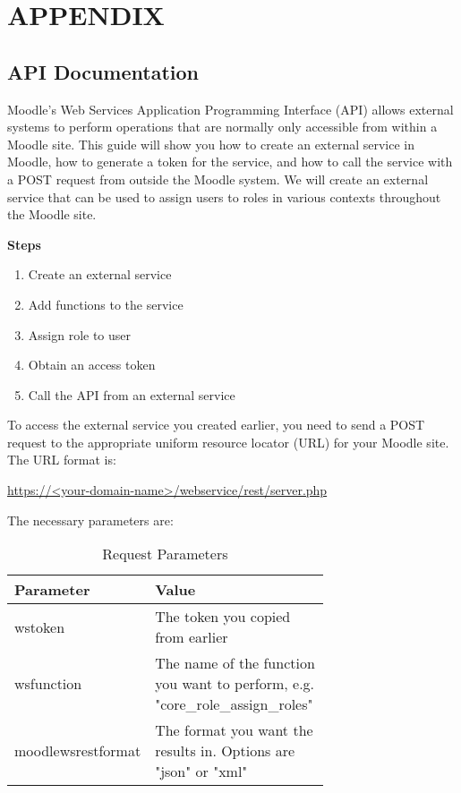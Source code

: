 \clearpage
\chapter*{APPENDIX}

\section{API Documentation}

Moodle's Web Services Application Programming Interface (API) allows external systems to perform operations that are normally only accessible from within a Moodle site. This guide will show you how to create an external service in Moodle, how to generate a token for the service, and how to call the service with a POST request from outside the Moodle system. We will create an external service that can be used to assign users to roles in various contexts throughout the Moodle site.

\textbf{Steps}
\begin{enumerate}
    \item Create an external service
    \item Add functions to the service
    \item Assign role to user
    \item Obtain an access token
    \item Call the API from an external service
\end{enumerate}


To access the external service you created earlier, you need to send a POST request to the appropriate uniform resource locator (URL) for your Moodle site. The URL format is:

\href{https://<your-domain-name>/webservice/rest/server.php}{https://<your-domain-name>/webservice/rest/server.php}

The necessary parameters are:
\begin{table}[H]
    \centering
    \begin{tabular}{|l|p{0.7\linewidth}|}
        \hline
        \textbf{Parameter} & \textbf{Value} \\
        \hline
        wstoken & The token you copied from earlier \\
        \hline
        wsfunction & The name of the function you want to perform, e.g. "core\_role\_assign\_roles" \\
        \hline
        moodlewsrestformat & The format you want the results in. Options are "json" or "xml" \\
        \hline
    \end{tabular}
    \caption{Request Parameters}
    \label{tab:request-params}
\end{table}


